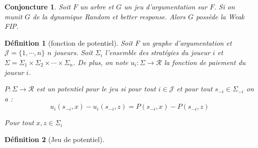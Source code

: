 \documentclass[11pt]{article}
\newtheorem{conjoncture}{Conjoncture}[section]
\theoremstyle{defi}
\newtheorem{definition}{Définition}[section]
\theoremstyle{not}
\theoremstyle{prob}
\begin{document}
      \begin{conjoncture}
        Soit $F$ un arbre et $G$ un jeu d'argumentation sur $F$. Si on munit $G$ de la dynamique \emph{Random} et \emph{better response}.
        Alors $G$ possède la Weak FIP.
      \end{conjoncture}


      \begin{definition}[fonction de potentiel]
        Soit $F$ un graphe d'argumentation et $\mathcal{J} = \{1, \cdots, n\}$ $n$ joueurs.
        Soit $\Sigma_i$ l'ensemble des stratégies du joueur $i$ et $\Sigma = \Sigma_1 \times \Sigma_2 \times \cdots \times \Sigma_n$.
        De plus, on note $u_i : \Sigma \longrightarrow \mathcal{R}$ la fonction de paiement du joueur $i$.

        $P : \Sigma \longrightarrow \mathcal{R}$ est un potentiel pour le jeu si pour tout $i \in \mathcal{J}$ et pour tout $s_{-i} \in \Sigma_{-i}$ on a :
        $$
          u_i(s_{-i}, x) - u_i(s_{-i}, z) = P(s_{-i}, x) - P(s_{-i}, z)
        $$

        Pour tout $x, z \in \Sigma_i$
      \end{definition}



      \begin{definition}[Jeu de potentiel]

      \end{definition}





    \newpage




  \appendix
\end{document}
